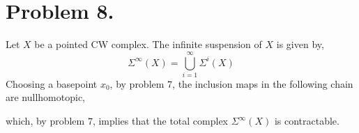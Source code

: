 \documentclass[12pt]{extarticle}
\begin{document}
\section*{Problem 8.}

Let $X$ be a pointed CW complex. The infinite suspension of $X$ is given by,
\[ \Sigma^\infty (X) = \bigcup_{i = 1}^\infty \Sigma^i(X) \]
Choosing a basepoint $x_0$, by problem $7$, the inclusion maps in the following chain are nullhomotopic,
\begin{center}
\end{center} 
which, by problem $7$, implies that the total complex $\Sigma^\infty(X)$ is contractable.
\end{document}
